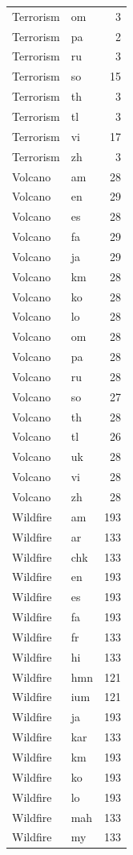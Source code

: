 \begin{longtable}{p{3cm} p{3cm} r}
Terrorism & om & 3 \\
Terrorism & pa & 2 \\
Terrorism & ru & 3 \\
Terrorism & so & 15 \\
Terrorism & th & 3 \\
Terrorism & tl & 3 \\
Terrorism & vi & 17 \\
Terrorism & zh & 3 \\
Volcano & am & 28 \\
Volcano & en & 29 \\
Volcano & es & 28 \\
Volcano & fa & 29 \\
Volcano & ja & 29 \\
Volcano & km & 28 \\
Volcano & ko & 28 \\
Volcano & lo & 28 \\
Volcano & om & 28 \\
Volcano & pa & 28 \\
Volcano & ru & 28 \\
Volcano & so & 27 \\
Volcano & th & 28 \\
Volcano & tl & 26 \\
Volcano & uk & 28 \\
Volcano & vi & 28 \\
Volcano & zh & 28 \\
Wildfire & am & 193 \\
Wildfire & ar & 133 \\
Wildfire & chk & 133 \\
Wildfire & en & 193 \\
Wildfire & es & 193 \\
Wildfire & fa & 193 \\
Wildfire & fr & 133 \\
Wildfire & hi & 133 \\
Wildfire & hmn & 121 \\
Wildfire & ium & 121 \\
Wildfire & ja & 193 \\
Wildfire & kar & 133 \\
Wildfire & km & 193 \\
Wildfire & ko & 193 \\
Wildfire & lo & 193 \\
Wildfire & mah & 133 \\
Wildfire & my & 133 \\

\end{longtable}
